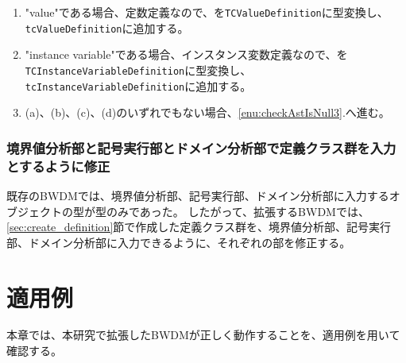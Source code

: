 \documentclass[uplatex, report, a4j, 10pt]{jsbook}
\newcommand\ttt[1]{\texttt{#1}}
\begin{document}
\begin{enumerate}
\begin{enumerate}
\begin{enumerate}
                \end{enumerate}
          \item "value"である場合、定数定義なので、\astDefinition{}を\ttt{TCValueDefinition}に型変換し、\ttt{tcValueDefinition}に追加する。
          \item "instance variable"である場合、インスタンス変数定義なので、\astDefinition{}を\ttt{TCInstanceVariableDefinition}に型変換し、\ttt{tcInstanceVariableDefinition}に追加する。
          \item (a)、(b)、(c)、(d)のいずれでもない場合、\ref{enu:checkAstIsNull3}.へ進む。
        \end{enumerate}
\end{enumerate}

\subsection{境界値分析部と記号実行部とドメイン分析部で定義クラス群を入力とするように修正}
既存のBWDMでは、境界値分析部、記号実行部、ドメイン分析部に入力するオブジェクトの型が\TCExplicitFunctionDefinition{}型のみであった。
したがって、拡張するBWDMでは、\ref{sec:create_definition}節で作成した定義クラス群を、境界値分析部、記号実行部、ドメイン分析部に入力できるように、それぞれの部を修正する。

\chapter{適用例}\label{cha:Indication}
本章では、本研究で拡張したBWDMが正しく動作することを、適用例を用いて確認する。
\end{document}
